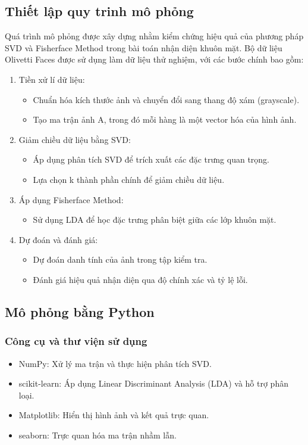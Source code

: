 \documentclass[a4paper,12pt]{extarticle}
\begin{document}
\subsection{Thiết lập quy trinh mô phỏng}
Quá trình mô phỏng được xây dựng nhằm kiểm chứng hiệu quả của phương pháp SVD và Fisherface Method trong bài toán nhận diện khuôn mặt. Bộ dữ liệu Olivetti Faces được sử dụng làm dữ liệu thử nghiệm, với các bước chính bao gồm:
\begin{enumerate}
    \item Tiền xử lí dữ liệu:
    \begin{itemize}
        \item Chuẩn hóa kích thước ảnh và chuyển đổi sang thang độ xám (grayscale). 
        \item Tạo ma trận ảnh A, trong đó mỗi hàng là một vector hóa của hình ảnh.
    \end{itemize}
    \item Giảm chiều dữ liệu bằng SVD:
    \begin{itemize}
        \item Áp dụng phân tích SVD để trích xuất các đặc trưng quan trọng. 
        \item Lựa chọn k thành phần chính để giảm chiều dữ liệu.
    \end{itemize}
    \item Áp dụng Fisherface Method:
    \begin{itemize}
        \item Sử dụng LDA để học đặc trưng phân biệt giữa các lớp khuôn mặt.
    \end{itemize}
    \item Dự đoán và đánh giá:
    \begin{itemize}
        \item Dự đoán danh tính của ảnh trong tập kiểm tra.
        \item Đánh giá hiệu quả nhận diện qua độ chính xác và tỷ lệ lỗi.
    \end{itemize}
\end{enumerate}
\subsection{Mô phỏng bằng Python}
\subsubsection{Công cụ và thư viện sử dụng}
\begin{itemize}
    \item NumPy: Xử lý ma trận và thực hiện phân tích SVD.
    \item scikit-learn: Áp dụng Linear Discriminant Analysis (LDA) và hỗ trợ phân loại.
    \item Matplotlib: Hiển thị hình ảnh và kết quả trực quan.
    \item seaborn: Trực quan hóa ma trận nhầm lẫn.
\end{itemize}
\end{document}
